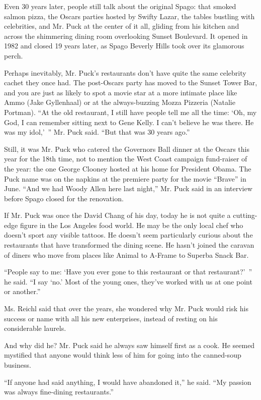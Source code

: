 Even 30 years later, people still talk about the original Spago: that
smoked salmon pizza, the Oscars parties hosted by Swifty Lazar, the
tables bustling with celebrities, and Mr. Puck at the center of it all,
gliding from his kitchen and across the shimmering dining room
overlooking Sunset Boulevard. It opened in 1982 and closed 19 years
later, as Spago Beverly Hills took over its glamorous perch.

Perhaps inevitably, Mr. Puck's restaurants don't have quite the same
celebrity cachet they once had. The post-Oscars party has moved to the
Sunset Tower Bar, and you are just as likely to spot a movie star at a
more intimate place like Ammo (Jake Gyllenhaal) or at the always-buzzing
Mozza Pizzeria (Natalie Portman). ``At the old restaurant, I still have
people tell me all the time: `Oh, my God, I can remember sitting next to
Gene Kelly. I can't believe he was there. He was my idol,'~'' Mr. Puck
said. ``But that was 30 years ago.''

Still, it was Mr. Puck who catered the Governors Ball dinner at the
Oscars this year for the 18th time, not to mention the West Coast
campaign fund-raiser of the year: the one George Clooney hosted at his
home for President Obama. The Puck name was on the napkins at the
premiere party for the movie ``Brave'' in June. ``And we had Woody Allen
here last night,'' Mr. Puck said in an interview before Spago closed for
the renovation.

If Mr. Puck was once the David Chang of his day, today he is not quite a
cutting-edge figure in the Los Angeles food world. He may be the only
local chef who doesn't sport any visible tattoos. He doesn't seem
particularly curious about the restaurants that have transformed the
dining scene. He hasn't joined the caravan of diners who move from
places like Animal to A-Frame to Superba Snack Bar.

``People say to me: `Have you ever gone to this restaurant or that
restaurant?'~'' he said. ``I say `no.' Most of the young ones, they've
worked with us at one point or another.''

Ms. Reichl said that over the years, she wondered why Mr. Puck would
risk his success or name with all his new enterprises, instead of
resting on his considerable laurels.

And why did he? Mr. Puck said he always saw himself first as a cook. He
seemed mystified that anyone would think less of him for going into the
canned-soup business.

``If anyone had said anything, I would have abandoned it,'' he said.
``My passion was always fine-dining restaurants.''

